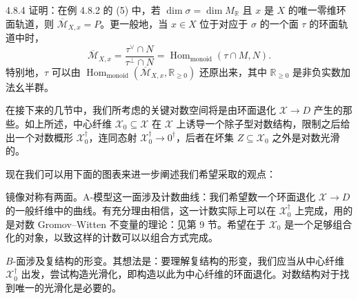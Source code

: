 \begin{exercise}{4.8.4}
证明：在例 4.8.2 的 (5) 中，若 $\dim\sigma=\dim M_{\mathbb{R}}$ 且 $x$ 是 $X$ 的唯一零维环面轨道，则 $\overline{\mathcal{M}}_{X,x}=P$。更一般地，当 $x\in X$ 位于对应于 $\sigma$ 的一个面 $\tau$ 的环面轨道中时，
\[
\overline{\mathcal{M}}_{X,x}=\frac{\tau^\vee\cap N}{\tau^\perp\cap N}=\operatorname{Hom}_{\mathrm{monoid}}(\tau\cap M,N).
\]
特别地，$\tau$ 可以由 $\operatorname{Hom}_{\mathrm{monoid}}(\overline{\mathcal{M}}_{X,x},\mathbb{R}_{\ge 0})$ 还原出来，其中 $\mathbb{R}_{\ge 0}$ 是非负实数加法幺半群。\proofend
\end{exercise}

在接下来的几节中，我们所考虑的关键对数空间将是由环面退化 $\mathcal{X}\to D$ 产生的那些。如上所述，中心纤维 $\mathcal{X}_0\subseteq\mathcal{X}$ 在 $\mathcal{X}$ 上诱导一个除子型对数结构，限制之后给出一个对数概形 $\mathcal{X}_0^\dagger$，连同态射 $\mathcal{X}_0^\dagger\to 0^\dagger$，后者在坏集 $Z\subseteq\mathcal{X}_0$ 之外是对数光滑的。

现在我们可以用下面的图表来进一步阐述我们希望采取的观点：
\begin{center}
\end{center}

镜像对称有两面。A-模型这一面涉及计数曲线：我们希望数一个环面退化 $\mathcal{X}\to D$ 的一般纤维中的曲线。有充分理由相信，这一计数实际上可以在 $\mathcal{X}_0^\dagger$ 上完成，用的是对数 Gromov--Witten 不变量的理论：见第 9 节。希望在于 $\mathcal{X}_0$ 是一个足够组合化的对象，以致这样的计数可以以组合方式完成。

$B$-面涉及复结构的形变。其想法是：要理解复结构的形变，我们应当从中心纤维 $\mathcal{X}_0^\dagger$ 出发，尝试构造光滑化，即构造以此为中心纤维的环面退化。对数结构对于找到唯一的光滑化是必要的。
